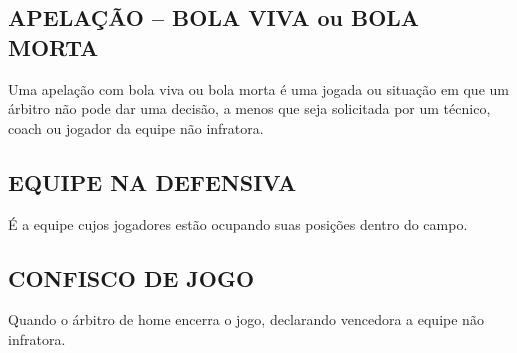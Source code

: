 \subsection{APELAÇÃO -- BOLA VIVA ou BOLA MORTA}
Uma apelação com bola viva ou bola morta é uma jogada ou situação em que um árbitro não pode dar uma decisão, a menos que seja solicitada por um  técnico, \gls{coach} ou jogador da equipe não infratora.

\subsection{EQUIPE NA DEFENSIVA}
É a equipe cujos jogadores estão ocupando suas posições dentro do campo.
\subsection{CONFISCO DE JOGO}

Quando o árbitro de \gls{home} encerra o jogo, declarando vencedora a equipe não infratora.

